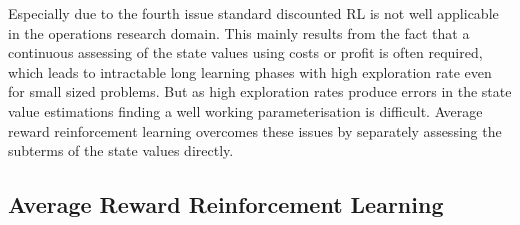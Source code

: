 \documentclass[envcountsame]{llncs}
\begin{document}

Especially due to the fourth issue standard discounted RL is not well applicable in the operations
research domain. This mainly results from the fact that a continuous assessing of the state values
using costs or profit is often required, which leads to intractable long learning phases with high
exploration rate even for small sized problems. But as high exploration rates produce errors in the
state value estimations \citep{MillerVeinott1969} finding a well working parameterisation is
difficult. Average reward reinforcement learning overcomes these issues by separately assessing the
subterms of the state values directly.


\subsection{Average Reward Reinforcement Learning}
\end{document}
